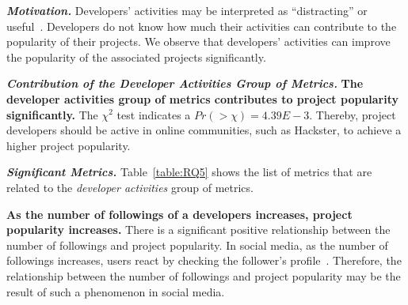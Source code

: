 \noindent \textbf{\RQfive}




\vspace{0.1cm}

\noindent\textbf{\textit{Motivation.}} 
Developers' activities may be interpreted as ``distracting'' or useful~\cite{leonardi2013enterprise}. Developers do not know how much their activities can contribute to the popularity of their projects. We observe that developers' activities can improve the popularity of the associated projects significantly.

\vspace{0.1cm}

\noindent\textbf{\textit{Contribution of the Developer Activities Group of Metrics.}} \textbf{The developer activities group of metrics contributes to project popularity significantly.} The $\chi^2$ test indicates a $Pr(>\chi)=4.39E-3$. Thereby, project developers should be active in online communities, such as Hackster, to achieve a higher project popularity.

\vspace{0.1cm}



\noindent\textbf{\textit{Significant Metrics.}} Table~\ref{table:RQ5} shows the
list of metrics that are related to the {\em developer activities} group of metrics.

\textbf{As the number of followings of a developers increases, project popularity increases.} There is a significant positive relationship between the number of followings and project popularity. In social media, as the number of followings increases, users react by checking the follower's profile~\cite{kwak2010twitter,postill2012social}. Therefore, the relationship between the number of followings and project popularity may be the result of such a phenomenon in social media.


